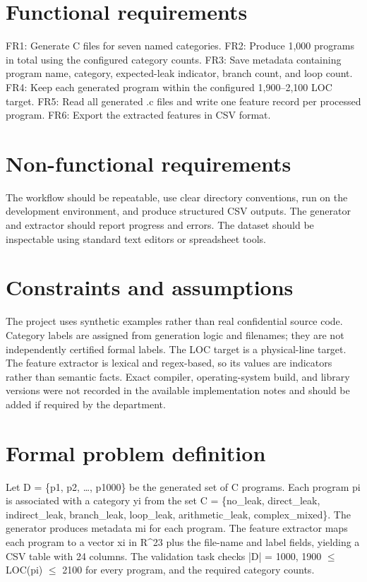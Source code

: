 \documentclass[12pt,a4paper,oneside]{report}
\begin{document}
\section{Functional requirements}
FR1: Generate C files for seven named categories. FR2: Produce 1,000 programs in total using the configured category counts. FR3: Save metadata containing program name, category, expected-leak indicator, branch count, and loop count. FR4: Keep each generated program within the configured 1,900--2,100 LOC target. FR5: Read all generated .c files and write one feature record per processed program. FR6: Export the extracted features in CSV format.\par

\section{Non-functional requirements}
The workflow should be repeatable, use clear directory conventions, run on the development environment, and produce structured CSV outputs. The generator and extractor should report progress and errors. The dataset should be inspectable using standard text editors or spreadsheet tools.\par

\section{Constraints and assumptions}
The project uses synthetic examples rather than real confidential source code. Category labels are assigned from generation logic and filenames; they are not independently certified formal labels. The LOC target is a physical-line target. The feature extractor is lexical and regex-based, so its values are indicators rather than semantic facts. Exact compiler, operating-system build, and library versions were not recorded in the available implementation notes and should be added if required by the department.\par

\section{Formal problem definition}
Let D = \{p1, p2, \ldots{}, p1000\} be the generated set of C programs. Each program pi is associated with a category yi from the set C = \{no\_leak, direct\_leak, indirect\_leak, branch\_leak, loop\_leak, arithmetic\_leak, complex\_mixed\}. The generator produces metadata mi for each program. The feature extractor maps each program to a vector xi in R\textasciicircum{}23 plus the file-name and label fields, yielding a CSV table with 24 columns. The validation task checks |D| = 1000, 1900 $\leq$ LOC(pi) $\leq$ 2100 for every program, and the required category counts.\par
\end{document}
